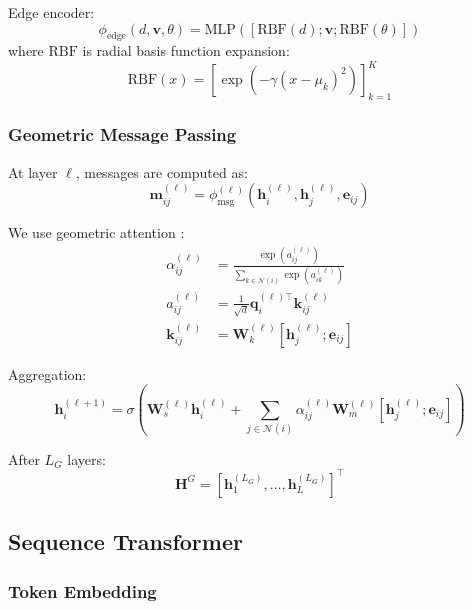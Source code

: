 \documentclass[12pt,en]{elegantpaper}
\begin{document}
Edge encoder:
\begin{equation}
    \phi_{\text{edge}}(d, \mathbf{v}, \theta) = \text{MLP}([\text{RBF}(d); \mathbf{v}; \text{RBF}(\theta)])
\end{equation}
where $\text{RBF}$ is radial basis function expansion:
\begin{equation}
    \text{RBF}(x) = [\exp(-\gamma (x - \mu_k)^2)]_{k=1}^K
\end{equation}

\subsubsection{Geometric Message Passing}

At layer $\ell$, messages are computed as:
\begin{equation}
    \mathbf{m}_{ij}^{(\ell)} = \phi_{\text{msg}}^{(\ell)}(\mathbf{h}_i^{(\ell)}, \mathbf{h}_j^{(\ell)}, \mathbf{e}_{ij})
\end{equation}

We use geometric attention \citep{jing2021learning}:
\begin{align}
    \alpha_{ij}^{(\ell)} &= \frac{\exp(a_{ij}^{(\ell)})}{\sum_{k \in \mathcal{N}(i)} \exp(a_{ik}^{(\ell)})} \\
    a_{ij}^{(\ell)} &= \frac{1}{\sqrt{d}} \mathbf{q}_i^{(\ell)\top} \mathbf{k}_{ij}^{(\ell)} \\
    \mathbf{k}_{ij}^{(\ell)} &= \mathbf{W}_k^{(\ell)} [\mathbf{h}_j^{(\ell)}; \mathbf{e}_{ij}]
\end{align}

Aggregation:
\begin{equation}
    \mathbf{h}_i^{(\ell+1)} = \sigma\left(\mathbf{W}_s^{(\ell)} \mathbf{h}_i^{(\ell)} + \sum_{j \in \mathcal{N}(i)} \alpha_{ij}^{(\ell)} \mathbf{W}_m^{(\ell)} [\mathbf{h}_j^{(\ell)}; \mathbf{e}_{ij}] \right)
\end{equation}

After $L_G$ layers:
\begin{equation}
    \mathbf{H}^G = [\mathbf{h}_1^{(L_G)}, \ldots, \mathbf{h}_L^{(L_G)}]^\top
\end{equation}

\subsection{Sequence Transformer}

\subsubsection{Token Embedding}
\end{document}
